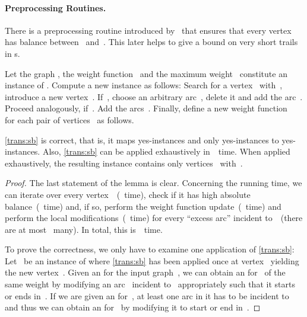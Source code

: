 \paragraph{Preprocessing Routines.}
There is a preprocessing routine introduced by~\citet{DMNW10} that ensures that every vertex has balance between~ and~. This later helps to give a bound on very short trails in \EE s.
\begin{transformation}
  \label{trans:sb}
  Let the graph , the weight function~ and the maximum weight~ constitute an instance of \pWMEEs{}. Compute a new instance as follows: Search for a vertex~ with~, introduce a new vertex~. If~, choose an arbitrary arc~, delete it and add the arc~. Proceed analogously, if~. Add the arcs~. Finally, define a new weight function~ for each pair of vertices~ as follows.

\end{transformation}
\begin{lemma}
  \label{lem:smallbalancepp}
  \autoref{trans:sb} is correct, that is, it maps yes-instances and only yes-instances to yes-instances. Also, \autoref{trans:sb} can be applied exhaustively in~~time. When applied exhaustively, the resulting instance contains only vertices~ with~.
\end{lemma}
\begin{proof}
  The last statement of the lemma is clear. Concerning the running time, we can iterate over every vertex~~(~time), check if it has high absolute balance~(~time) and, if so, perform the weight function update~(~time) and perform the local modifications~(~time) for every ``excess arc'' incident to~~(there are at most~ many). In total, this is~~time.

  To prove the correctness, we only have to examine one application of \autoref{trans:sb}: Let~ be an instance of \pWMEEs{} where \autoref{trans:sb} has been applied once at vertex~ yielding the new vertex~. Given an \EE{} for the input graph~, we can obtain an \EE{} for~ of the same weight by modifying an arc~ incident to~ appropriately such that it starts or ends in~. If we are given an \EE{} for~, at least one arc in it has to be incident to~ and thus we can obtain an \EE{} for~ by modifying it to start or end in~.
\end{proof}


